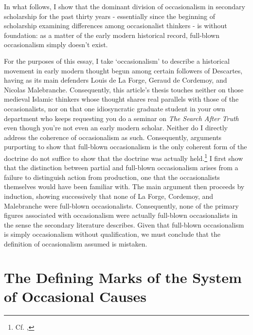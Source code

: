 \documentclass[]{article}
\begin{document}
In what follows, I show that the dominant division of occasionalism in secondary scholarship for the past thirty years - essentially since the beginning of scholarship examining differences among occasionalist thinkers - is without foundation: as a matter of the early modern historical record, full-blown occasionalism simply doesn't exist. 

For the purposes of this essay, I take `occasionalism' to describe a historical movement in early modern thought begun among certain followers of Descartes, having as its main defenders Louis de La Forge, Geraud de Cordemoy, and Nicolas Malebranche. Consequently, this article's thesis touches neither on those medieval Islamic thinkers whose thought shares real parallels with those of the occasionalists, nor on that one idiosyncratic graduate student in your own department who keeps requesting you do a seminar on \emph{The Search After Truth} even though you're not even an early modern scholar. Neither do I directly address the coherence of occasionalism as such. Consequently, arguments purporting to show that full-blown occasionalism is the only coherent form of the doctrine do not suffice to show that the doctrine was actually held.\footnote{Cf. \autocite{Nadler1998,Winkler2011}, } I first show that the distinction between partial and full-blown occasionalism arises from a failure to distinguish action from production, one that the occasionalists themselves would have been familiar with. The main argument then proceeds by induction, showing successively that none of La Forge, Cordemoy, and Malebranche were full-blown occasionalists. Consequently, none of the primary figures associated with occasionalism were actually full-blown occasionalists in the sense the secondary literature describes. Given that full-blown occasionalism is simply occasionalism without qualification, we must conclude that the definition of occasionalism assumed is mistaken.


\section{The Defining Marks of the System of Occasional Causes}
\end{document}
